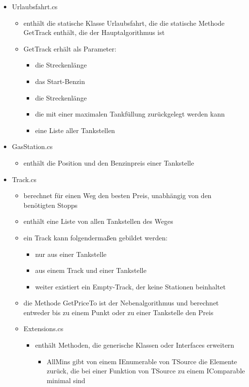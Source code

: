 \documentclass[a4paper,10pt,ngerman]{scrartcl}
\begin{document}
\begin{itemize}
	\item Urlaubsfahrt.cs
	\begin{itemize}
		\item enthält die statische Klasse Urlaubsfahrt, die die statische Methode GetTrack enthält, die der Hauptalgorithmus ist
		\item GetTrack erhält als Parameter:
		 \begin{itemize}
		 	\item die Streckenlänge
		 	\item das Start-Benzin 
		 	\item die Streckenlänge
		 	\item die mit einer maximalen Tankfüllung zurückgelegt werden kann
		 	\item eine Liste aller Tankstellen
		\end{itemize}
	\end{itemize}
		\item GasStation.cs
	\begin{itemize}
		\item enthält die Position und den Benzinpreis einer Tankstelle
	\end{itemize}
		\item Track.cs
	\begin{itemize}
		\item berechnet für einen Weg den besten Preis, unabhängig von den benötigten Stopps
		\item enthält eine Liste von allen Tankstellen des Weges
		\item ein Track kann folgendermaßen gebildet werden:
		\begin{itemize}
			\item nur aus einer Tankstelle
			\item aus einem Track und einer Tankstelle
			\item weiter existiert ein Empty-Track, der keine Stationen beinhaltet
		\end{itemize}
			\item die Methode GetPriceTo ist der Nebenalgorithmus und berechnet entweder bis zu einem Punkt oder zu einer Tankstelle den Preis
			\item Extensions.cs
		\begin{itemize}
			\item enthält Methoden, die generische Klassen oder Interfaces erweitern
			\begin{itemize}
				\item AllMins gibt von einem IEnumerable von TSource die Elemente zurück, die bei einer Funktion von TSource zu einem IComparable minimal sind
			\end{itemize}
		\end{itemize}
		
	\end{itemize}
\end{itemize}
\end{document}
